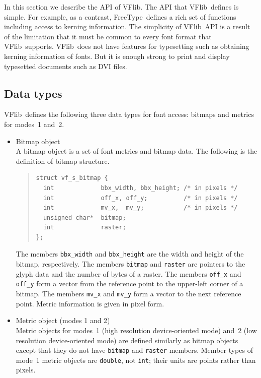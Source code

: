 \documentclass{cah-gut}
\newcommand{\pkg}[1]{\textsf{#1}}
\newcommand{\prog}[1]{\texttt{#1}}
\newcommand{\VFlib}{\pkg{VFlib}}
\newcommand{\freetype}{\pkg{FreeType}}
\begin{document}
In this section we describe the API of \VFlib.  The API that \VFlib\ 
defines is simple.  For example, as a contrast, \freetype\ defines 
a rich set of functions including access to kerning information.  
The simplicity of \VFlib\ API is a result of the limitation that 
it must be common to every font format that \VFlib\ supports.  
\VFlib\ does not have features for typesetting such as obtaining 
kerning information of fonts.  But it is enough strong to print and 
display typesetted documents such as DVI files.

\subsection{Data types}

\VFlib\ defines the following three data types for font access: bitmaps
and metrics for modes~1 and~2.

\begin{itemize}  
\item Bitmap object \\
  A bitmap object is a set of font metrics and bitmap data.  The
  following is the definition of bitmap structure.

\begin{quote}
\begin{small}
\setlength{\baselineskip}{1em}
\begin{verbatim}
struct vf_s_bitmap {
  int             bbx_width, bbx_height; /* in pixels */
  int             off_x, off_y;          /* in pixels */
  int             mv_x,  mv_y;           /* in pixels */
  unsigned char*  bitmap;
  int             raster;
};
\end{verbatim}
\end{small}
\end{quote}

  The members \prog{bbx\_width} and \prog{bbx\_height} are the width
  and height of the bitmap, respectively.  The members \prog{bitmap}
  and \prog{raster} are pointers to the glyph data and the number of
  bytes of a raster.  The members \prog{off\_x} and \prog{off\_y} 
  form a vector from the reference point to the upper-left corner of a
  bitmap.  The members \prog{mv\_x} and \prog{mv\_y} form a vector to
  the next reference point.  Metric information is given in pixel form.
  
\item Metric object (modes 1 and 2) \\
  Metric objects for modes~1 (high resolution device-oriented mode)
  and~2 (low resolution device-oriented mode) are defined similarly 
  as bitmap objects except that they do not have \prog{bitmap} and
  \prog{raster} members.  Member types of mode~1 metric objects 
  are \prog{double}, not \prog{int}; their units are points rather 
  than pixels.
\end{itemize}
\end{document}
